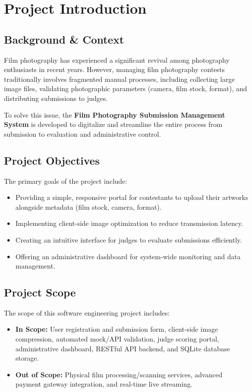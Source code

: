 \chapter{Project Introduction}

\section{Background \& Context}
Film photography has experienced a significant revival among photography enthusiasts in recent years. However, managing film photography contests traditionally involves fragmented manual processes, including collecting large image files, validating photographic parameters (camera, film stock, format), and distributing submissions to judges.

To solve this issue, the \textbf{Film Photography Submission Management System} is developed to digitalize and streamline the entire process from submission to evaluation and administrative control.

\section{Project Objectives}
The primary goals of the project include:
\begin{itemize}
    \item Providing a simple, responsive portal for contestants to upload their artworks alongside metadata (film stock, camera, format).
    \item Implementing client-side image optimization to reduce transmission latency.
    \item Creating an intuitive interface for judges to evaluate submissions efficiently.
    \item Offering an administrative dashboard for system-wide monitoring and data management.
\end{itemize}

\section{Project Scope}
The scope of this software engineering project includes:
\begin{itemize}
    \item \textbf{In Scope:} User registration and submission form, client-side image compression, automated mock/API validation, judge scoring portal, administrative dashboard, RESTful API backend, and SQLite database storage.
    \item \textbf{Out of Scope:} Physical film processing/scanning services, advanced payment gateway integration, and real-time live streaming.
\end{itemize}